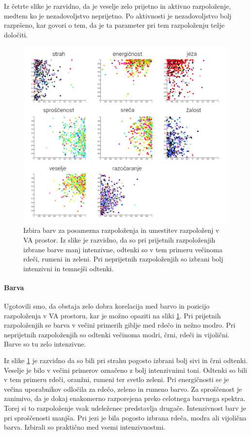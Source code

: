 \documentclass[a4paper, 12pt]{book}
\begin{document}
{Iz četrte slike je razvidno, da je veselje zelo prijetno in aktivno razpoloženje, medtem ko je nezadovoljstvo neprijetno. Po aktivnosti je nezadovoljstvo bolj razpršeno, kar govori o tem, da je ta parameter pri tem razpoloženju težje določiti.

\begin{figure}[!hbt]
\centering
\includegraphics[width=14cm]{images/mood_color.png}

\caption{Izbira barv za posamezna razpoloženja in umestitev razpoloženj v VA prostor. Iz slike je razvidno, da so pri prijetnih razpoloženjih izbrane barve manj intenzivne, odtenki so v tem primeru večinoma rdeči, rumeni in zeleni. Pri neprijetnih razpoloženjih so izbrani bolj intenzivni in temnejši odtenki.}
\label{moodcolor}
\end{figure} 

\paragraph{Barva}

Ugotovili smo, da obstaja zelo dobra korelacija med barvo in  pozicijo razpoloženja v VA prostoru, kar je možno opaziti na sliki \ref{moodcolor}. Pri prijetnih razpoloženjih se barva v večini primerih giblje med rdečo in nežno modro. Pri neprijetnih razpoloženjih so odtenki večinoma modri, črni, rdeči in vijolični. Barve so tu zelo intenzivne.

Iz slike \ref{moodcolor} je razvidno da so bili pri strahu pogosto izbrani bolj sivi in črni odtenki. Veselje je bilo v večini primerov označeno z bolj intenzivnimi toni. Odtenki so bili v tem primeru rdeči, oranžni, rumeni ter svetlo zeleni. Pri energičnosti se je večina uporabnikov odločila za rdečo, zeleno in rumeno barvo. Za sproščenost je zanimivo, da je dokaj enakomerno razporejena preko celotnega barvnega spektra. Torej si to razpoloženje vsak udeleženec predstavlja drugače. Intenzivnost barv je pri sproščenosti manjša. Pri jezi je bila pogosto izbrana rdeča, modra ali vijolična barva. Izbirali so praktično med vsemi intenzivnostmi.


}
\end{document}
